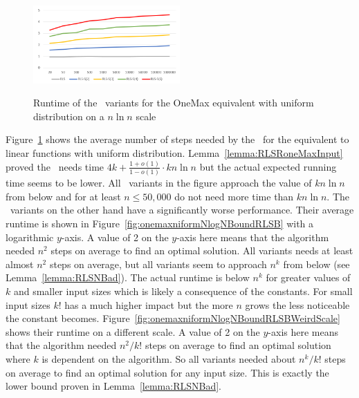 \begin{figure}[h]
      \centering
            \caption{Runtime of the \RLSR~variants for the OneMax equivalent with uniform distribution on a $n\ln n$ scale}
            \includegraphics[width=0.5\textwidth]{figures/images/oneMaxUniformMultipleN_RLSRCompare.png}\label{fig:onemaxniformNlogNBoundRLSR}
\end{figure}

Figure~\ref{fig:onemaxniformNlogNBoundRLSR} shows the average number of steps needed by the \RLSR~for the equivalent to linear functions with uniform distribution.
Lemma~\ref{lemma:RLSRoneMaxInput} proved the \RLSR~needs time $4k+\frac{1+o(1)}{1-o(1)}\cdot kn\ln n$ but the actual expected running time seems to be lower.
All \RLSR[k]~variants in the figure approach the value of $kn\ln n$ from below and for at least $n\le50,000$ do not need more time than $kn\ln n$.
The \RLSN[k]~variants on the other hand have a significantly worse performance.
Their average runtime is shown in Figure~\ref{fig:onemaxniformNlogNBoundRLSB} with a logarithmic $y$-axis.
A value of 2 on the $y$-axis here means that the algorithm needed $n^2$ steps on average to find an optimal solution.
All \RLSN[k] variants needs at least almost $n^2$ steps on average, but all variants seem to approach $n^k$ from below (see Lemma~\ref{lemma:RLSNBad}).
The actual runtime is below $n^k$ for greater values of $k$ and smaller input sizes which is likely a consequence of the constants.
For small input sizes $k!$ has a much higher impact but the more $n$ grows the less noticeable the constant becomes.
Figure~\ref{fig:onemaxniformNlogNBoundRLSBWeirdScale} shows their runtime on a different scale.
A value of 2 on the $y$-axis here means that the algorithm needed $n^2/k!$ steps on average to find an optimal solution where $k$ is dependent on the algorithm.
So all \RLSN[k] variants needed about $n^k/k!$ steps on average to find an optimal solution for any input size.
This is exactly the lower bound proven in Lemma~\ref{lemma:RLSNBad}.

